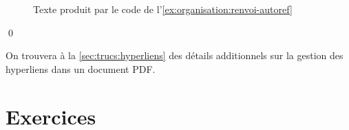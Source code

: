 \begin{exemple}
  \begin{figure}
    \centering
    \caption{Texte produit par le code de
      l'\autoref{ex:organisation:renvoi-autoref}}
    \label{fig:organisation:renvoi-autoref}
  \end{figure}
  \qed
\end{exemple}

On trouvera à la \autoref{sec:trucs:hyperliens} des détails
additionnels sur la gestion des hyperliens dans un document PDF.



\section{Exercices}
\label{sec:apparence:exercices}

